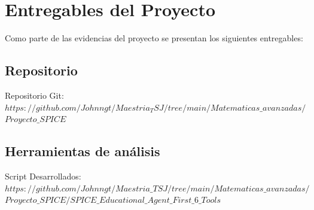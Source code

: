 \section{Entregables del Proyecto}

Como parte de las evidencias del proyecto se presentan los siguientes entregables:

\subsection{Repositorio}

Repositorio Git: $https://github.com/Johnngt/Maestria_TSJ/tree/main/Matematicas\_avanzadas/$
$Proyecto\_SPICE$

\subsection{Herramientas de análisis}
 Script Desarrollados: $https://github.com/Johnngt/Maestria\_TSJ/tree/main/Matematicas\_avanzadas/$
 $Proyecto\_SPICE/SPICE\_Educational\_Agent\_First\_6\_Tools$
 
